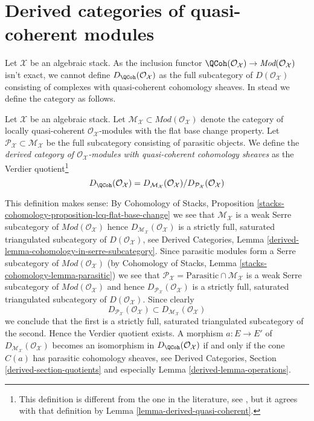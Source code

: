 





\section{Derived categories of quasi-coherent modules}
\label{section-derived}

\noindent
Let $\mathcal{X}$ be an algebraic stack. As the inclusion functor
$\QCoh(\mathcal{O}_\mathcal{X}) \to
\textit{Mod}(\mathcal{O}_\mathcal{X})$ isn't exact, we cannot define
$D_\QCoh(\mathcal{O}_\mathcal{X})$ as the full subcategory
of $D(\mathcal{O}_\mathcal{X})$ consisting of complexes with quasi-coherent
cohomology sheaves. In stead we define the category as follows.

\begin{definition}
\label{definition-derived}
Let $\mathcal{X}$ be an algebraic stack. Let
$\mathcal{M}_\mathcal{X} \subset \textit{Mod}(\mathcal{O}_\mathcal{X})$
denote the category of locally quasi-coherent
$\mathcal{O}_\mathcal{X}$-modules with the flat base change property.
Let $\mathcal{P}_\mathcal{X} \subset \mathcal{M}_\mathcal{X}$
be the full subcategory consisting of parasitic objects.
We define the {\it derived category of $\mathcal{O}_\mathcal{X}$-modules with
quasi-coherent cohomology sheaves} as the Verdier quotient\footnote{This
definition is different from the one in the literature, see
\cite[6.3]{olsson_sheaves}, but it agrees with that definition
by Lemma \ref{lemma-derived-quasi-coherent}.}
$$
D_\QCoh(\mathcal{O}_\mathcal{X}) =
D_{\mathcal{M}_\mathcal{X}}(\mathcal{O}_\mathcal{X})/
D_{\mathcal{P}_\mathcal{X}}(\mathcal{O}_\mathcal{X})
$$
\end{definition}

\noindent
This definition makes sense: By
Cohomology of Stacks,
Proposition \ref{stacks-cohomology-proposition-lcq-flat-base-change}
we see that $\mathcal{M}_\mathcal{X}$ is a weak Serre subcategory
of $\textit{Mod}(\mathcal{O}_\mathcal{X})$
hence $D_{\mathcal{M}_\mathcal{X}}(\mathcal{O}_\mathcal{X})$
is a strictly full, saturated triangulated subcategory of
$D(\mathcal{O}_\mathcal{X})$, see
Derived Categories, Lemma \ref{derived-lemma-cohomology-in-serre-subcategory}.
Since parasitic modules form a Serre subcategory of
$\textit{Mod}(\mathcal{O}_\mathcal{X})$ (by
Cohomology of Stacks,
Lemma \ref{stacks-cohomology-lemma-parasitic}) we see that
$\mathcal{P}_\mathcal{X} = \text{Parasitic} \cap \mathcal{M}_\mathcal{X}$
is a weak Serre subcategory of $\textit{Mod}(\mathcal{O}_\mathcal{X})$ and
hence $D_{\mathcal{P}_\mathcal{X}}(\mathcal{O}_\mathcal{X})$
is a strictly full, saturated triangulated subcategory of
$D(\mathcal{O}_\mathcal{X})$. Since clearly
$$
D_{\mathcal{P}_\mathcal{X}}(\mathcal{O}_\mathcal{X})
\subset
D_{\mathcal{M}_\mathcal{X}}(\mathcal{O}_\mathcal{X})
$$
we conclude that the first is a strictly full, saturated triangulated
subcategory of the second. Hence the Verdier quotient exists. A morphism
$a : E \to E'$ of
$D_{\mathcal{M}_\mathcal{X}}(\mathcal{O}_\mathcal{X})$ becomes an
isomorphism in $D_\QCoh(\mathcal{O}_\mathcal{X})$ if and
only if the cone $C(a)$ has parasitic cohomology sheaves, see
Derived Categories, Section \ref{derived-section-quotients} and especially
Lemma \ref{derived-lemma-operations}.

